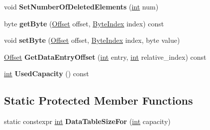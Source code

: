 \begin{DoxyCompactItemize}
\mbox{\label{classv8_1_1internal_1_1SmallOrderedHashTable_a4c124b32699182cc63ad8c16e354ecd5}} 
void {\bfseries Set\+Number\+Of\+Deleted\+Elements} (\mbox{\hyperlink{classint}{int}} num)
\item 
\mbox{\label{classv8_1_1internal_1_1SmallOrderedHashTable_a718683d99cff845b2f2f12725f2d8ae5}} 
byte {\bfseries get\+Byte} (\mbox{\hyperlink{classint}{Offset}} offset, \mbox{\hyperlink{classint}{Byte\+Index}} index) const
\item 
\mbox{\label{classv8_1_1internal_1_1SmallOrderedHashTable_a30fb01bcd28a2d0c0701a317eaee01c5}} 
void {\bfseries set\+Byte} (\mbox{\hyperlink{classint}{Offset}} offset, \mbox{\hyperlink{classint}{Byte\+Index}} index, byte value)
\item 
\mbox{\label{classv8_1_1internal_1_1SmallOrderedHashTable_aa6f60fcc706ea5b0ee15ce3a301ded0a}} 
\mbox{\hyperlink{classint}{Offset}} {\bfseries Get\+Data\+Entry\+Offset} (\mbox{\hyperlink{classint}{int}} entry, \mbox{\hyperlink{classint}{int}} relative\+\_\+index) const
\item 
\mbox{\label{classv8_1_1internal_1_1SmallOrderedHashTable_a68185c7f3189f546dd54e8753d3e7144}} 
\mbox{\hyperlink{classint}{int}} {\bfseries Used\+Capacity} () const
\end{DoxyCompactItemize}
\subsection*{Static Protected Member Functions}
\begin{DoxyCompactItemize}
\item 
\mbox{\label{classv8_1_1internal_1_1SmallOrderedHashTable_acf419c9345613aa4c88167083980c7d0}} 
static constexpr \mbox{\hyperlink{classint}{int}} {\bfseries Data\+Table\+Size\+For} (\mbox{\hyperlink{classint}{int}} capacity)
\end{DoxyCompactItemize}
